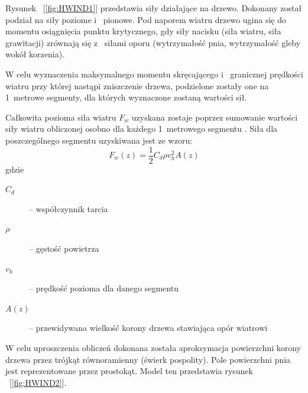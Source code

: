 \documentclass[a4paper,12pt]{article}
\begin{document}
Rysunek ~[\ref{fig:HWIND1}] przedstawia siły działające na drzewo. Dokonany został podział na siły poziome i ~pionowe.
Pod naporem wiatru drzewo ugina się do momentu osiągnięcia punktu krytycznego, gdy siły nacisku (siła wiatru, siła grawitacji) zrównają się z ~siłami oporu (wytrzymałość pnia, wytrzymałość gleby wokół korzenia).

W celu wyznaczenia maksymalnego momentu skręcającego i ~granicznej prędkości wiatru przy której nastąpi zniszczenie drzewa, podzielone zostały one na 1~metrowe segmenty, dla których wyznaczone zostaną wartości sił.

Całkowita pozioma siła wiatru $F_w$ uzyskana zostaje poprzez sumowanie wartości siły wiatru obliczonej osobno dla każdego 1~metrowego segmentu \cite{chm_mgza}. Siła dla poszczególnego segmentu uzyskiwana jest ze wzoru:
$$ F_w(z) = \frac{1}{2}C_d  \rho v_h^2 A(z) $$ 
gdzie

\begin{description}
  \item[$C_d$] -- współczynnik tarcia
  \item[$\rho$ ]-- gęstość powietrza
  \item[$v_h$ ]-- prędkość pozioma dla danego segmentu
  \item[$A(z)$]-- przewidywana wielkość korony drzewa stawiająca opór wiatrowi
\end{description}

W celu uproszczenia obliczeń dokonana została aproksymacja powierzchni korony drzewa przez trójkąt równoramienny (świerk pospolity). Pole powierzchni pnia jest reprezentowane przez prostokąt. Model ten przedstawia rysunek ~[\ref{fig:HWIND2}].
\end{document}
